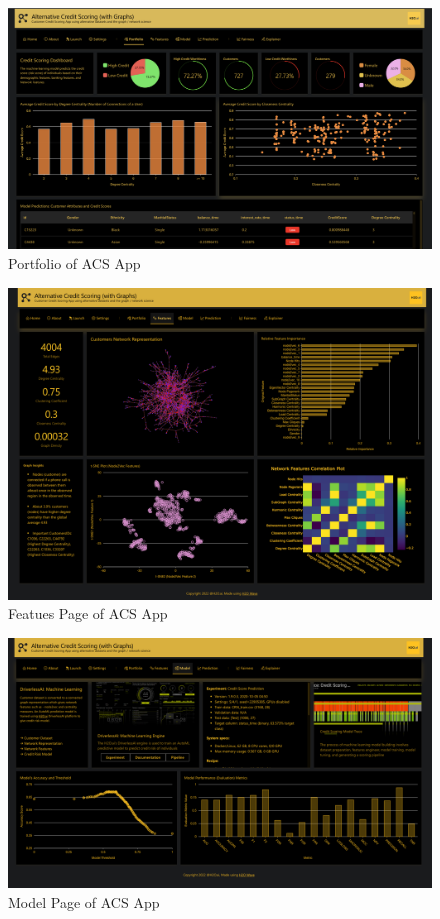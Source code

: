 \documentclass[12pt,a4paper]{report}
\begin{document}
\begin{figure}[H]
\centering
\includegraphics[width=1\textwidth]{a3.png}
\caption{Portfolio of ACS App}
\end{figure}

\begin{figure}[H]
\centering
\includegraphics[width=1\textwidth]{a8.png}
\caption{Featues Page of ACS App}
\end{figure}


\begin{figure}[H]
\centering
\includegraphics[width=1\textwidth]{a4.png}
\caption{Model Page of ACS App}
\end{figure}
\end{document}
